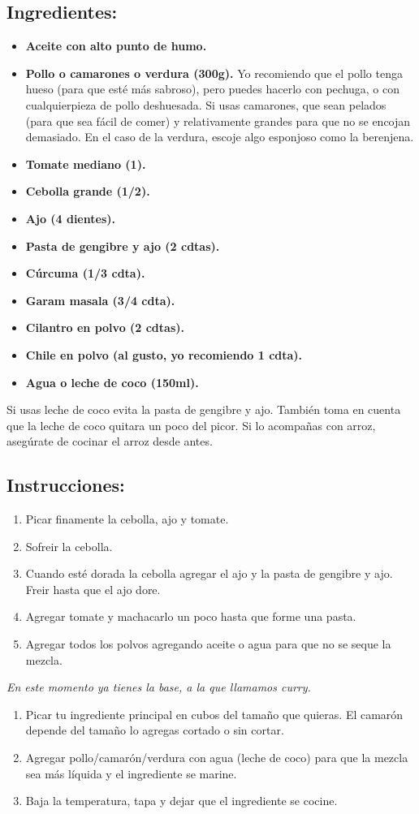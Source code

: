 \documentclass{book}
\begin{document}
\subsection*{Ingredientes:}
\begin{itemize}
	\item \textbf{Aceite con alto punto de humo.}
	\item \textbf{Pollo o camarones o verdura (300g).}
		\subitem Yo recomiendo que el pollo tenga hueso (para que esté más sabroso), pero puedes hacerlo con pechuga, o con cualquierpieza de pollo deshuesada.
		\subitem Si usas camarones, que sean pelados (para que sea fácil de comer) y relativamente grandes para que no se encojan demasiado.
		\subitem En el caso de la verdura, escoje algo esponjoso como la berenjena.
	\item \textbf{Tomate mediano (1).}
	\item \textbf{Cebolla grande (1/2).}
	\item \textbf{Ajo (4 dientes).}
	\item \textbf{Pasta de gengibre y ajo (2 cdtas).}
	\item \textbf{Cúrcuma (1/3 cdta).}
	\item \textbf{Garam masala (3/4 cdta).}
	\item \textbf{Cilantro en polvo (2 cdtas).}
	\item \textbf{Chile en polvo (al gusto, yo recomiendo 1 cdta).}
	\item \textbf{Agua o leche de coco (150ml).}
\end{itemize}
Si usas leche de coco evita la pasta de gengibre y ajo. También toma en cuenta que la leche de coco quitara un poco del picor.
Si lo acompañas con arroz, asegúrate de cocinar el arroz desde antes.
\subsection*{Instrucciones:}
\begin{enumerate}
	\item Picar finamente la cebolla, ajo y tomate.
	\item Sofreir la cebolla.
	\item Cuando esté dorada la cebolla agregar el ajo y la pasta de gengibre y ajo.
		Freir hasta que el ajo dore.
	\item Agregar tomate y machacarlo un poco hasta que forme una pasta.
	\item Agregar todos los polvos agregando aceite o agua para que no se seque la mezcla.
\end{enumerate}
\textit{En este momento ya tienes la base, a la que llamamos curry.}
\begin{enumerate}
	\item Picar tu ingrediente principal en cubos del tamaño que quieras. El camarón depende del tamaño lo agregas cortado o sin cortar.
	\item Agregar pollo/camarón/verdura con agua (leche de coco) para que la mezcla sea más líquida y el ingrediente se marine.
	\item Baja la temperatura, tapa y dejar que el ingrediente se cocine.
\end{enumerate}
\end{document}
